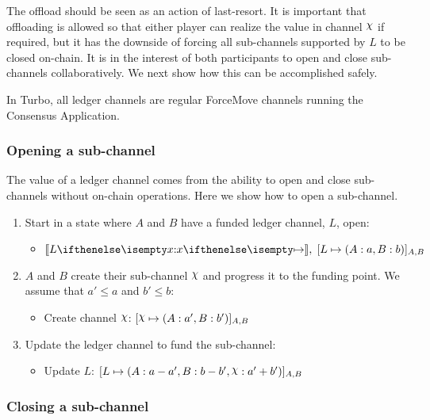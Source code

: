 \documentclass{article}
\begin{document}
The offload should be seen as an action of last-resort.
It is important that offloading is allowed so that either player can realize the value in channel $\rchi$ if required, but it has the downside of forcing all sub-channels supported by $L$ to be closed on-chain.
It is in the interest of both participants to open and close sub-channels collaboratively.
We next show how this can be accomplished safely.

In Turbo, all ledger channels are regular ForceMove channels running the Consensus Application.

\subsubsection{Opening a sub-channel}

The value of a ledger channel comes from the ability to open and close sub-channels without on-chain operations.
Here we show how to open a sub-channel.
\begin{enumerate}
  \item Start in a state where $A$ and $B$ have a funded ledger channel, $L$, open:
  \begin{itemize}
    \item $\adj{\holds{L}{x}{}}, \; \finalizable{L}{\alloc{A: a, B: b}}{A, B}$
  \end{itemize}
  \item $A$ and $B$ create their sub-channel $\rchi$ and progress it to the funding point. We assume that $a' \leq a$ and $b' \leq b$:
  \begin{itemize}
    \item Create channel $\rchi$: $\finalizable{\rchi}{\alloc{A:a', B:b'}}{A,B}$
  \end{itemize}
  \item Update the ledger channel to fund the sub-channel:
  \begin{itemize}
    \item Update $L$: $\finalizable{L}{\alloc{A:a-a', B: b - b', \rchi: a' + b'}}{A,B}$
  \end{itemize}
\end{enumerate}

\subsubsection{Closing a sub-channel}
\end{document}
